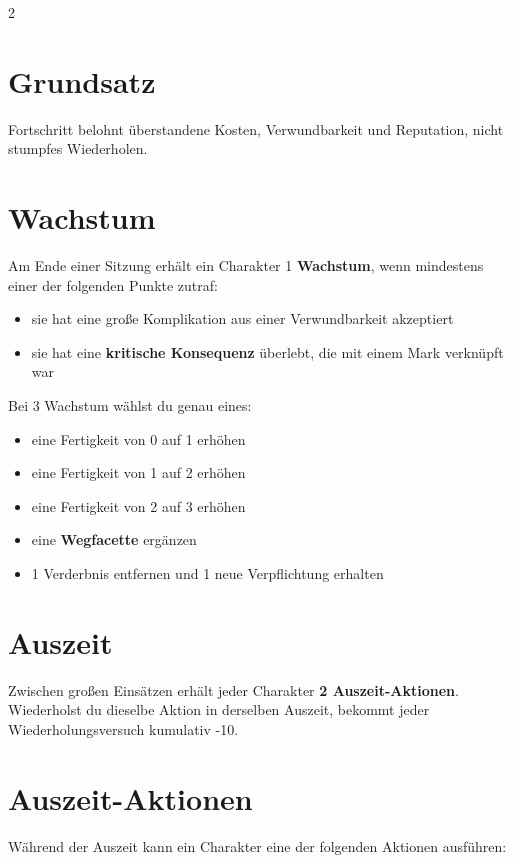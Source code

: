 \label{ch:fortschritt}

\begin{multicols*}{2}
\section{Grundsatz}
Fortschritt belohnt überstandene Kosten, Verwundbarkeit und Reputation, nicht stumpfes Wiederholen.

\section{Wachstum}
Am Ende einer Sitzung erhält ein Charakter 1 \textbf{Wachstum}, wenn mindestens einer der folgenden Punkte zutraf:
\begin{itemize}[leftmargin=*]
\item sie hat eine große Komplikation aus einer Verwundbarkeit akzeptiert
\item sie hat eine \textbf{kritische Konsequenz} überlebt, die mit einem Mark verknüpft war
\end{itemize}

Bei 3 Wachstum wählst du genau eines:
\begin{itemize}[leftmargin=*]
\item eine Fertigkeit von 0 auf 1 erhöhen
\item eine Fertigkeit von 1 auf 2 erhöhen
\item eine Fertigkeit von 2 auf 3 erhöhen
\item eine \textbf{Wegfacette} ergänzen
\item 1 Verderbnis entfernen und 1 neue Verpflichtung erhalten
\end{itemize}

\section{Auszeit}
Zwischen großen Einsätzen erhält jeder Charakter \textbf{2 Auszeit-Aktionen}.
Wiederholst du dieselbe Aktion in derselben Auszeit, bekommt jeder Wiederholungsversuch kumulativ -10.

\section{Auszeit-Aktionen}

Während der Auszeit kann ein Charakter eine der folgenden Aktionen ausführen:


\end{multicols*}
